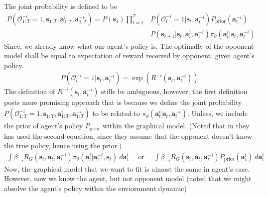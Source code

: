 \noindent
The joint probability is defined to be 
\begin{equation}
    \begin{aligned}
        P(\mathcal{O}^{-i}_{1:T} = 1, \boldsymbol{s}_{1:T}, \boldsymbol{a}^i_{1:T}, \boldsymbol{a}^{-i}_{1:T}) = P(\boldsymbol{s}_1) \prod^T_{t=1} &P(\mathcal{O}^{-i}_{t} = 1 | \boldsymbol{s}_{t}, \boldsymbol{a}^{-i}_{t}) P_{\text{prior}}(\boldsymbol{a}^{-i}_t) \\
        &P(\boldsymbol{s}_{t+1} | \boldsymbol{s}_{t}, \boldsymbol{a}^i_{t}, \boldsymbol{a}^{-i}_{t}) \pi_{\theta}(\boldsymbol{a}^{i}_t | \boldsymbol{s}_t, \boldsymbol{a}^{-i}_t)
    \end{aligned}
\end{equation}
Since, we already know what our agent's policy is. The optimally of the opponent model shall be equal to expectation of reward received by opponent, given agent's policy. 
\begin{equation}
    \begin{aligned}
        P(\mathcal{O}^{-i}_{t} = 1 | \boldsymbol{s}_{t}, \boldsymbol{a}^{-i}_{t}) = \exp\left(R^{-i}(\boldsymbol{s}_t, \boldsymbol{a}^{-i}_t)\right)
    \end{aligned}
\end{equation}
The definition of $R^{-i}(\boldsymbol{s}_t, \boldsymbol{a}_t^{-i})$ stills be ambiguous, however, the first definition posts more promising approach that is because we define the joint probability $P(\mathcal{O}^{-i}_{1:T} = 1, \boldsymbol{s}_{1:T}, \boldsymbol{a}^i_{1:T}, \boldsymbol{a}^{-i}_{1:T})$ to be related to $\pi_{\theta}(\boldsymbol{a}^{i}_t | \boldsymbol{s}_t, \boldsymbol{a}^{-i}_t)$. Unless, we include the prior of agent's policy $P_{\text{prior}}$ within the graphical model. (Noted that in \cite{grau2018balancing} they has used the second equation, since they assume that the opponent doesn't know the true policy, hence using the prior.)
\begin{equation}
    \begin{aligned}
        \int \beta_{-i}R_G(\boldsymbol{s}_t, \boldsymbol{a}_t, \boldsymbol{a}^{-i}_t) \pi_{\theta}(\boldsymbol{a}^i_t | \boldsymbol{a}^{-i}_t, \boldsymbol{s}_t) \ d\boldsymbol{a}^i_t \quad \text{ or } \quad
        \int \beta_{-i}R_G(\boldsymbol{s}_t, \boldsymbol{a}_t, \boldsymbol{a}^{-i}_t) P_{\text{prior}}(\boldsymbol{a}^i_t) \ d\boldsymbol{a}^i_t 
    \end{aligned}
\end{equation}
Now, the graphical model that we want to fit is almost the same in agent's case. However, now we know the agent, but not opponent model (noted that we might absolve the agent's policy within the enviornment dynamic)
